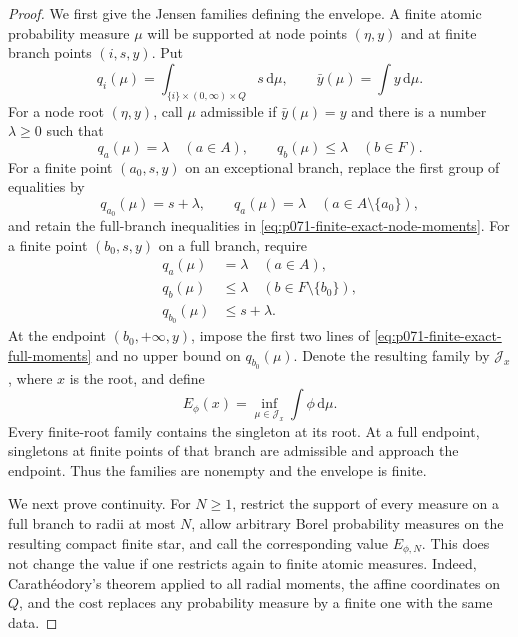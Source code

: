 \begin{proof}
We first give the Jensen families defining the envelope.  A finite atomic
probability measure \(\mu\) will be supported at node points
\((\eta,y)\) and at finite branch points \((i,s,y)\).  Put
\[
 q_i(\mu)=\int_{\{i\}\times(0,\infty)\times Q}s\,\mathrm d\mu,
 \qquad
 \bar y(\mu)=\int y\,\mathrm d\mu.
\]
For a node root \((\eta,y)\), call \(\mu\) admissible if
\(\bar y(\mu)=y\) and there is a number \(\lambda\geq0\) such that
\begin{equation}
 q_a(\mu)=\lambda\quad(a\in A),
 \qquad
 q_b(\mu)\leq\lambda\quad(b\in F).
 \label{eq:p071-finite-exact-node-moments}
\end{equation}
For a finite point \((a_0,s,y)\) on an exceptional branch, replace the
first group of equalities by
\begin{equation}
 q_{a_0}(\mu)=s+\lambda,\qquad
 q_a(\mu)=\lambda\quad(a\in A\setminus\{a_0\}),
 \label{eq:p071-finite-exact-exception-moments}
\end{equation}
and retain the full-branch inequalities in
\eqref{eq:p071-finite-exact-node-moments}.  For a finite point
\((b_0,s,y)\) on a full branch, require
\begin{equation}
 \begin{split}
 q_a(\mu)&=\lambda \quad(a\in A),\\
 q_b(\mu)&\leq\lambda \quad(b\in F\setminus\{b_0\}),\\
 q_{b_0}(\mu)&\leq s+\lambda .
 \end{split}
 \label{eq:p071-finite-exact-full-moments}
\end{equation}
At the endpoint \((b_0,+\infty,y)\), impose the first two lines of
\eqref{eq:p071-finite-exact-full-moments} and no upper bound on
\(q_{b_0}(\mu)\).  Denote the resulting family by
\(\mathcal J_x\), where \(x\) is the root, and define
\begin{equation}
             E_\phi(x)=\inf_{\mu\in\mathcal J_x}\int\phi\,\mathrm d\mu.
 \label{eq:p071-finite-exact-moment-envelope}
\end{equation}
Every finite-root family contains the singleton at its root.  At a full
endpoint, singletons at finite points of that branch are admissible and
approach the endpoint.  Thus the families are nonempty and the envelope is
finite.

We next prove continuity.  For \(N\geq1\), restrict the support of every
measure on a full branch to radii at most \(N\), allow arbitrary Borel
probability measures on the resulting compact finite star, and call the
corresponding value \(E_{\phi,N}\).  This does not change the value if one
restricts again to finite atomic measures.  Indeed, Carath\'eodory's theorem
applied to all radial moments, the affine coordinates on \(Q\), and the
cost replaces any probability measure by a finite one with the same data.


\end{proof}
